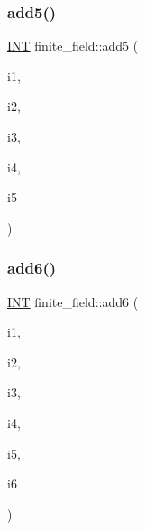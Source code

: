 \mbox{\label{classfinite__field_a65a2509b29f168f5ef4290a551835f75}} 
\subsubsection{\texorpdfstring{add5()}{add5()}}
{\footnotesize\ttfamily \mbox{\hyperlink{galois_8h_a09fddde158a3a20bd2dcadb609de11dc}{I\+NT}} finite\+\_\+field\+::add5 (\begin{DoxyParamCaption}\item[{\mbox{\hyperlink{galois_8h_a09fddde158a3a20bd2dcadb609de11dc}{I\+NT}}}]{i1,  }\item[{\mbox{\hyperlink{galois_8h_a09fddde158a3a20bd2dcadb609de11dc}{I\+NT}}}]{i2,  }\item[{\mbox{\hyperlink{galois_8h_a09fddde158a3a20bd2dcadb609de11dc}{I\+NT}}}]{i3,  }\item[{\mbox{\hyperlink{galois_8h_a09fddde158a3a20bd2dcadb609de11dc}{I\+NT}}}]{i4,  }\item[{\mbox{\hyperlink{galois_8h_a09fddde158a3a20bd2dcadb609de11dc}{I\+NT}}}]{i5 }\end{DoxyParamCaption})}

\mbox{\label{classfinite__field_a73a391d0accb9a11a8a08222d4419d74}} 
\subsubsection{\texorpdfstring{add6()}{add6()}}
{\footnotesize\ttfamily \mbox{\hyperlink{galois_8h_a09fddde158a3a20bd2dcadb609de11dc}{I\+NT}} finite\+\_\+field\+::add6 (\begin{DoxyParamCaption}\item[{\mbox{\hyperlink{galois_8h_a09fddde158a3a20bd2dcadb609de11dc}{I\+NT}}}]{i1,  }\item[{\mbox{\hyperlink{galois_8h_a09fddde158a3a20bd2dcadb609de11dc}{I\+NT}}}]{i2,  }\item[{\mbox{\hyperlink{galois_8h_a09fddde158a3a20bd2dcadb609de11dc}{I\+NT}}}]{i3,  }\item[{\mbox{\hyperlink{galois_8h_a09fddde158a3a20bd2dcadb609de11dc}{I\+NT}}}]{i4,  }\item[{\mbox{\hyperlink{galois_8h_a09fddde158a3a20bd2dcadb609de11dc}{I\+NT}}}]{i5,  }\item[{\mbox{\hyperlink{galois_8h_a09fddde158a3a20bd2dcadb609de11dc}{I\+NT}}}]{i6 }\end{DoxyParamCaption})}

